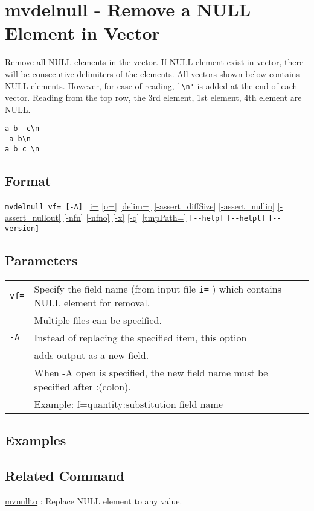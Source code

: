 
%

\section{mvdelnull - Remove a NULL Element in Vector \label{sect:mvdelnull}}
Remove all NULL elements in the vector. 
If NULL element exist in vector, there will be consecutive delimiters of the elements. 
All vectors shown below contains NULL elements. 
However, for ease of reading, \verb|`\n'| is added at the end of each vector. 
Reading from the top row, the 3rd element, 1st element, 4th element are NULL. 

\begin{Verbatim}[baselinestretch=0.7,frame=single]
a b  c\n
 a b\n
a b c \n
\end{Verbatim}

\subsection*{Format}
\verb/mvdelnull vf= [-A] /
\hyperref[sect:option_i]{i=}
\hyperref[sect:option_o]{[o=]}
\hyperref[sect:option_delim]{[delim=]} 
\hyperref[sect:option_assert_diffSize]{[-assert\_diffSize]}
\hyperref[sect:option_assert_nullin]{[-assert\_nullin]}
\hyperref[sect:option_assert_nullout]{[-assert\_nullout]}
\hyperref[sect:option_nfn]{[-nfn]} 
\hyperref[sect:option_nfno]{[-nfno]}  
\hyperref[sect:option_x]{[-x]}
\hyperref[sect:option_q]{[-q]}
\hyperref[sect:option_option_tmppath]{[tmpPath=]}
\verb|[--help]|
\verb|[--helpl]|
\verb|[--version]|\\

\subsection*{Parameters}
\begin{table}[htbp]
{\small
\begin{tabular}{ll}
\verb|vf=| & Specify the field name (from input file \verb|i=| ) which contains NULL element for removal. \\
           & Multiple files can be specified. \\
\verb|-A|  & Instead of replacing the specified item, this option\\
           &  adds output as a new field.\\
           & When -A open is specified, the new field name must be specified after :(colon).\\
           & Example:  f=quantity:substitution field name \\

\end{tabular}
}
\end{table} 

\subsection*{Examples}


\subsection*{Related Command}
\hyperref[sect:mvnullto]{mvnullto} : Replace NULL element to any value. 

%
